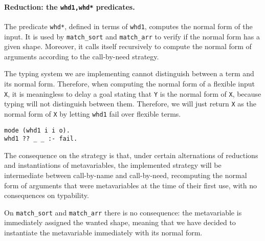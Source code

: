 \documentclass{easychair}
\begin{document}
\paragraph{Reduction: the \texttt{whd1,whd*} predicates.}
The predicate \verb+whd*+, defined in terms of \verb+whd1+, computes the normal form of the input. It is used by \verb+match_sort+ and \verb+match_arr+ to verify if the normal form has a given shape. Moreover, it calls itself recursively to compute the normal form of arguments according to the call-by-need strategy.

The typing system we are implementing cannot distinguish between a term and its normal form. Therefore, when computing the normal form of a flexible input \verb+X+, it is meaningless to delay a goal stating that \verb+Y+ is the normal form of \verb+X+, because typing will not distinguish between them.
Therefore, we will just return \verb+X+ as the normal form of \verb+X+ by letting \verb+whd1+ fail over flexible terms.
\begin{verbatim}
mode (whd1 i i o).
whd1 ?? _ _ :- fail.
\end{verbatim}

The consequence on the strategy is that, under certain alternations of reductions and instantiations of metavariables, the implemented strategy will be intermediate between call-by-name and call-by-need, recomputing the normal form of arguments that were metavariables at the time of their first use, with no consequences on typability.

On \verb+match_sort+ and \verb+match_arr+ there is no consequence: the metavariable is immediately assigned the wanted shape, meaning that we have decided to instantiate the metavariable immediately with its normal form.

%
%
%
\end{document}
